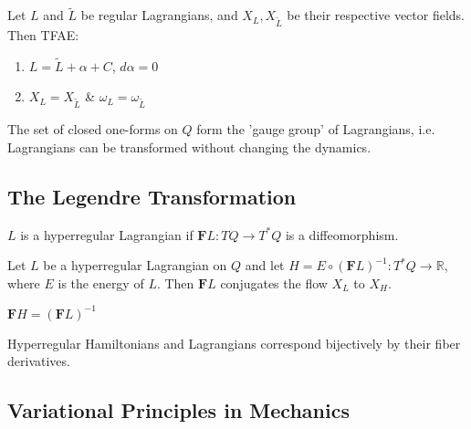 \documentclass{article}
\begin{document}
\begin{thm}

Let $L$ and $\tilde{L}$ be regular Lagrangians, and $X_L, X_{\tilde{L}}$ be their respective vector fields. Then TFAE:

\begin{enumerate}
    \item $L = \tilde{L} + \alpha + C$, $d \alpha = 0$
    \item $ X_L = X_{\tilde{L}} $ \& $ \omega_L = \omega_{\tilde{L}} $
\end{enumerate}

\end{thm}

The set of closed one-forms on $Q$ form the 'gauge group' of Lagrangians, i.e. Lagrangians can be transformed without changing the dynamics.

\subsection{The Legendre Transformation}

\begin{defn}

$L$ is a hyperregular Lagrangian if $\textbf{F}L: TQ \to T^*Q$ is a diffeomorphism.

\end{defn}

\begin{thm}

Let $L$ be a hyperregular Lagrangian on $Q$ and let $H = E \circ (\textbf{F}L)^{-1}: T^*Q \to \mathbb{R}$, where $E$ is the energy of $L$. Then $\textbf{F}L$ conjugates the flow $X_L$ to $X_H$.

\end{thm}

\begin{thm}

$\textbf{F}H = (\textbf{F}L)^{-1}$

\end{thm}

\begin{cor}

Hyperregular Hamiltonians and Lagrangians correspond bijectively by their fiber derivatives.

\end{cor}

\subsection{Variational Principles in Mechanics}
\end{document}
